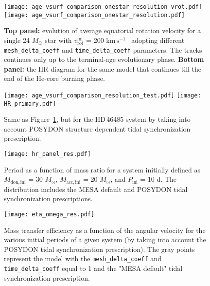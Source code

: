 \documentclass{aa}
\newcommand{\kms}{$\mathrm{km\,s^{-1}}$}
\DeclareRobustCommand{\Figref}[1]{Figure~\ref{#1}}
\begin{document}
\begin{figure}[!ht]
  \centering
  \texttt{[image: age\_vsurf\_comparison\_onestar\_resolution\_vrot.pdf]}
  \texttt{[image: age\_vsurf\_comparison\_onestar\_resolution.pdf]}
  \caption{{\bf Top panel:} evolution of average equatorial rotation
    velocity for a single 24 $M_{\odot}$ star with $v_\mathrm{rot}^\mathrm{ini}$ =
    200 \kms~ adopting different \texttt{mesh\_delta\_coeff} and
    \texttt{time\_delta\_coeff} parameters. The tracks continues only
    up to the terminal-age evolutionary phase.  {\bf Bottom panel:}
    the HR diagram for the same model that continues till the end of
    the He-core burning phase.}
  \label{fig:resolution_test_one_star}
\end{figure}


\begin{figure}[!ht]
  \centering
  \texttt{[image: age\_vsurf\_comparison\_resolution\_test.pdf]}
  \texttt{[image: HR\_primary.pdf]}
  \caption{Same as \Figref{fig:resolution_test_one_star}, but for the HD\,46485 system by taking into account POSYDON structure dependent tidal synchronization prescription.}
  \label{fig:resolution_test_tides}
\end{figure}



\begin{figure}[!ht]
  \centering
  \texttt{[image: hr\_panel\_res.pdf]}
  \caption{Period as a function of mass ratio for a system initially defined as $M_\mathrm{don,ini}$ = 30 $M_{\odot}$, $M_\mathrm{acc,ini}$ = 20 $M_{\odot}$, and $P_\mathrm{ini}$ = 10 d. The distribution includes the MESA default and POSYDON tidal synchronization prescriptions.}
  \label{fig:resolution_test_pvsq}
\end{figure}



\begin{figure}[!ht]
  \centering
  \texttt{[image: eta\_omega\_res.pdf]}
  \caption{Mass transfer efficiency as a function of the angular velocity for the various initial periods of a given system (by taking into account the POSYDON tidal synchronization prescription). The gray points represent the model with the \texttt{mesh\_delta\_coeff} and \texttt{time\_delta\_coeff} equal to 1 and the "MESA default" tidal synchronization prescription.}
  \label{fig:eta_omega_res}
\end{figure}
\end{document}
